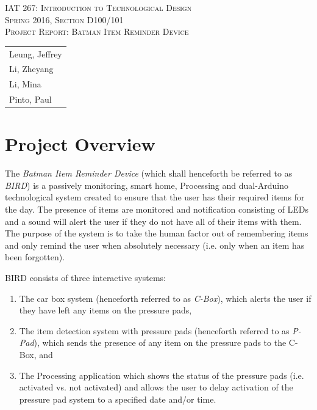 \documentclass[10pt, oneside, letterpaper, titlepage]{article}
\begin{document}
	\begin{titlepage}
		\begin{center}

			\vspace{15cm}
			\textsc{\Large IAT 267: Introduction to Technological Design}\\
			\vspace{1cm}
			\textsc{\Large Spring 2016, Section D100/101} \\
			\vspace{3.5cm}
			\textsc{\Large Project Report: Batman Item Reminder Device} \\
			\vspace{2cm}

			\begin{tabular}[c]{ l }
				Leung, Jeffrey \\
				Li, Zheyang  \\
				Li, Mina \\
				Pinto, Paul
			\end{tabular}
			\vspace{5cm}

		\end{center}
	\end{titlepage}

	\tableofcontents
	\clearpage

	\section{Project Overview}

		The \emph{Batman Item Reminder Device} (which shall henceforth be referred to as \emph{BIRD}) is a passively monitoring, smart home, Processing and dual-Arduino technological system created to ensure that the user has their required items for the day. The presence of items are monitored and notification consisting of LEDs and a sound will alert the user if they do not have all of their items with them. The purpose of the system is to take the human factor out of remembering items and only remind the user when absolutely necessary (i.e. only when an item has been forgotten).

		BIRD consists of three interactive systems:

		\begin{enumerate}

			\item The car box system (henceforth referred to as \emph{C-Box}), which alerts the user if they have left any items on the pressure pads,
			\item The item detection system with pressure pads (henceforth referred to as \emph{P-Pad}), which sends the presence of any item on the pressure pads to the C-Box, and
			\item The Processing application which shows the status of the pressure pads (i.e. activated vs. not activated) and allows the user to delay activation of the pressure pad system to a specified date and/or time.

		\end{enumerate}
\end{document}
